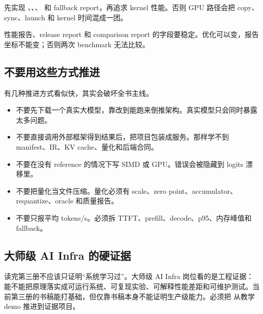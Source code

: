  先实现 、、、 和 fallback report，再追求 kernel 性能。否则 GPU 路径会把 copy、sync、launch 和 kernel 时间混成一团。

 性能报告、release report 和 comparison report 的字段要稳定。优化可以变，报告坐标不能变；否则两次 benchmark 无法比较。

\subsection{不要用这些方式推进}

有几种推进方式看似快，其实会破坏全书主线。

\begin{warningbox}
\begin{itemize}
  \item 不要先下载一个真实大模型，靠改到能跑来倒推架构。真实模型只会同时暴露太多问题。
  \item 不要直接调用外部框架得到结果后，把项目包装成服务。那样学不到 manifest、IR、KV cache、量化和后端合同。
  \item 不要在没有 reference 的情况下写 SIMD 或 GPU。错误会被隐藏到 logits 漂移里。
  \item 不要把量化当文件压缩。量化必须有 scale、zero point、accumulator、requantize、oracle 和质量报告。
  \item 不要只报平均 tokens/s。必须拆 TTFT、prefill、decode、p95、内存峰值和 fallback。
\end{itemize}
\end{warningbox}

\subsection{大师级 AI Infra 的硬证据}

读完第三册不应该只证明“系统学习过”。大师级 AI Infra 岗位看的是工程证据：能不能把原理落实成可运行系统、可复现实验、可解释性能差距和可维护测试。当前第三册的书稿能打基础，但仅靠书稿本身不能证明生产级能力。必须把  从教学 demo 推进到证据项目。

